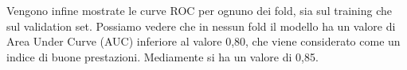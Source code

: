 Vengono infine mostrate le curve ROC per ognuno dei fold, sia sul training che 
sul validation set. Possiamo vedere che in nessun fold il modello ha un valore 
di Area Under Curve (AUC) inferiore al valore 0,80, che viene considerato come 
un indice di buone prestazioni. Mediamente si ha un valore di 0,85.

%	
%	
%	
%	
%	
%	
%	
%	
%	
%	

